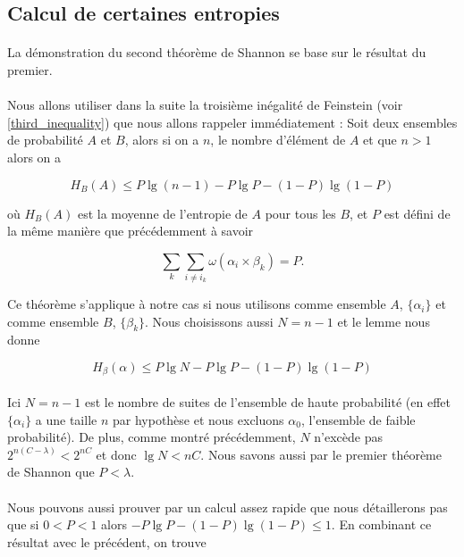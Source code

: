 \subsection*{Calcul de certaines entropies}

	\paragraph{}
	La démonstration du second théorème de Shannon se base sur le 
	résultat du premier. 
	
	\paragraph{}
	Nous allons utiliser dans la suite la troisième inégalité de Feinstein 
	(voir \ref{third_inequality}) que nous allons rappeler immédiatement :
	Soit deux ensembles de probabilité $A$ et $B$, alors si on a $n$, le 
	nombre d'élément de $A$ et que $n>1$ alors on a 
	
	\[H_B(A)\le P\lg (n-1) - P\lg P - (1-P)\lg(1-P)\]
	
	
	où $H_B(A)$ est la moyenne de l'entropie de $A$ pour tous
	les $B$, et $P$ est défini de la même manière que précédemment à savoir
	
	\[\sum_k\sum_{i\neq i_k}\omega(\alpha_i \times \beta_k) = P.\]	
	
	Ce théorème s'applique à notre cas si nous utilisons comme ensemble $A$,
	$\{\alpha_i\}$ et comme ensemble $B$, $\{\beta_k\}$. Nous choisissons
	aussi $N = n-1$ et le lemme nous donne
	
	\[H_\beta(\alpha)\le P\lg N - P\lg P - (1-P)\lg(1-P)\]
	
	\paragraph{}
	Ici $N = n-1$ est le nombre de suites de l'ensemble de haute probabilité 
	(en effet $\{\alpha_i\}$ a une taille $n$ par hypothèse et nous excluons
	$\alpha_0$, l'ensemble de faible probabilité). De plus, comme montré 
	précédemment, $N$ n'excède pas $2^{n(C-\lambda)}<2^{nC}$ et donc 
	$\lg N<nC$. Nous savons aussi par le premier théorème de Shannon 
	que $P<\lambda$.
	
	\paragraph{}
	Nous pouvons aussi prouver par un calcul assez rapide que nous détaillerons 
	pas que si $0<P<1$ alors $-P\lg P -(1-P)\lg(1-P)\le 1$. En combinant ce 
	résultat avec le précédent,	on trouve
	
